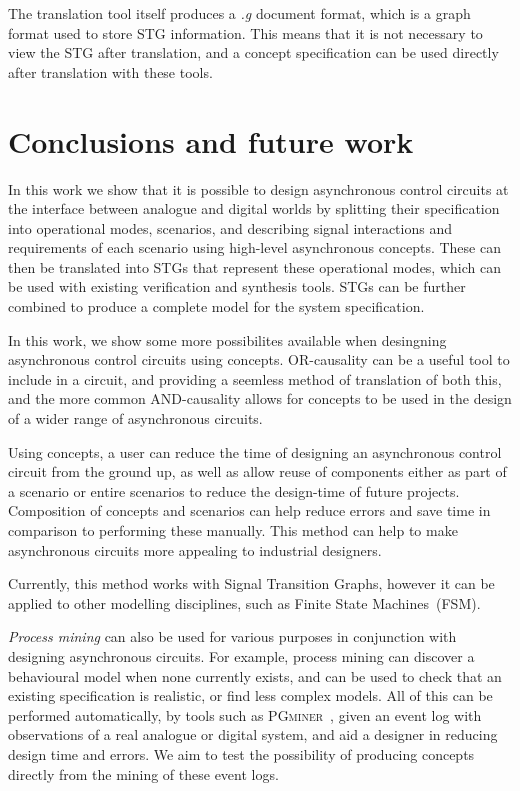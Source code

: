 \documentclass[british,conference,compsoc]{IEEEtran}
\newcommand{\noun}[1]{\textsc{#1}}
\begin{document}
The translation tool itself produces a \emph{.g} document format, which is a
graph format used to store STG information. This means that it is not
necessary to view the STG after translation, and a concept specification
can be used directly after translation with these tools. 


\section{Conclusions and future work\label{sec:conclusions}}

In this work we show that it is possible to design asynchronous control
circuits at the interface between analogue and digital worlds by
splitting their specification into operational modes, scenarios, and
describing signal interactions and requirements of each scenario using
high-level asynchronous concepts. These can then be translated into STGs
that represent these operational modes, which can be used with existing
verification and synthesis tools. STGs can be further combined to
produce a complete model for the system specification.

In this work, we show some more possibilites available when desingning
asynchronous control circuits using concepts. OR-causality can be a
useful tool to include in a circuit, and providing a seemless method
of translation of both this, and the more common AND-causality allows
for concepts to be used in the design of a wider range of asynchronous 
circuits.

Using concepts, a user can reduce the time of designing an asynchronous
control circuit from the ground up, as well as allow reuse of components
either as part of a scenario or entire scenarios to reduce the design-time
of future projects. Composition of concepts and scenarios can help
reduce errors and save time in comparison to performing these manually.
This method can help to make asynchronous circuits more appealing
to industrial designers.

Currently, this method works with Signal Transition Graphs, however
it can be applied to other modelling disciplines, such as Finite State
Machines~(FSM).

\emph{Process mining} can also be used for various purposes in conjunction
with designing asynchronous circuits. For example, process mining can discover
a behavioural model when none currently exists, and can be used to check 
that an existing specification is realistic, or find less complex models. 
All of this can be performed automatically, by tools such as
\noun{PGminer}~\cite{mokhov2016mining}, given
an event log with observations of a real analogue or digital system, and aid a
designer in reducing design time and errors. We aim to test the possibility of producing
concepts directly from the mining of these event logs.
\end{document}
